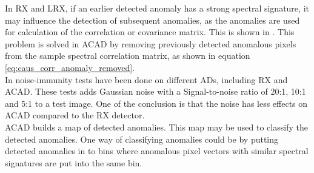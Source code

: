 In  RX and LRX, if an earlier detected anomaly has a strong spectral signature, it may influence the detection of subsequent anomalies, as the anomalies are used for calculation of the correlation or covariance matrix. This is shown in \cite{chang2006characterization}. This problem is solved in ACAD by removing previously detected anomalous pixels from the sample spectral correlation matrix, as shown in equation \ref{eq:caus_corr_anomaly_removed}. 
\\

In \cite{chang2006characterization} noise-immunity tests have been done on different ADs, including RX and ACAD. These tests adds Gaussian noise with a Signal-to-noise ratio of 20:1, 10:1 and 5:1 to a test image. One of the conclusion is that the noise has less effects on ACAD compared to the RX detector.
\\


ACAD builds a map of detected anomalies. This map may be used to classify the detected anomalies. One way of classifying anomalies could be by putting detected anomalies in to bins where anomalous pixel vectors with similar spectral signatures are put into the same bin. 
\\





